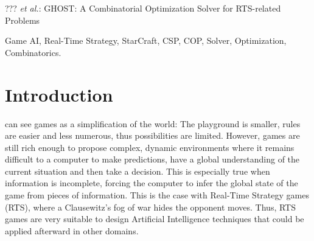 \documentclass[journal]{IEEEtran}
\newcommand{\ghost}{\textsc{GHOST}\xspace}
\begin{document}
%
{??? \MakeLowercase{\textit{et al.}}: \ghost: A Combinatorial Optimization Solver for RTS-related Problems}

\maketitle

\begin{abstract}
  This paper presents \ghost, a combinatorial optimization solver that
  an  RTS AI  developer can  use as  a blackbox  to solve  any problem
  encoded into a constraint satisfaction/optimization problem. We show
  how to model  three very different RTS problems,  each one belonging
  to   a   specific   level    of   abstraction,   by   a   constraint
  satisfaction/optimization problem and test our solver on them, using
  StarCraft as  a testbed. For  the three problems, \ghost  shows very
  good results computed within some tens of milliseconds.
\end{abstract}

\begin{IEEEkeywords}
Game   AI,   Real-Time   Strategy,  StarCraft,   CSP,   COP,   Solver,
Optimization, Combinatorics.
\end{IEEEkeywords}

%
\IEEEpeerreviewmaketitle

\section{Introduction}\label{sec:intro}

 can see games  as a simplification of the world:
The playground  is smaller, rules  are easier and less  numerous, thus
possibilities are  limited. However,  games are  still rich  enough to
propose complex, dynamic environments where  it remains difficult to a
computer  to make  predictions,  have a  global  understanding of  the
current situation  and then take  a decision. This is  especially true
when  information is  incomplete, forcing  the computer  to infer  the
global state of the game from  pieces of information. This is the case
with Real-Time Strategy  games (RTS), where a Clausewitz's  fog of war
hides the opponent moves.  Thus, RTS games are very suitable to design
Artificial Intelligence techniques that  could be applied afterward in
other domains.
\end{document}
